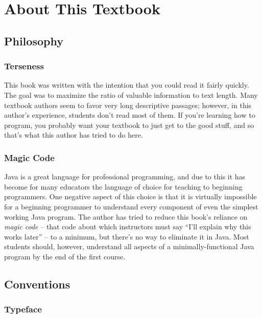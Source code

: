 
\chapter{About This Textbook}

\minitoc

\section{Philosophy}

\subsection{Terseness}
This book was written with the intention that you could read it fairly quickly.  The goal was to maximize the ratio of valuable information to text length.  Many textbook authors seem to favor very long descriptive passages; however, in this author's experience, students don't read most of them.  If you're learning how to program, you probably want your textbook to just get to the good stuff, and so that's what this author has tried to do here.

\subsection{Magic Code}\label{subsection:magiccode}
Java is a great language for professional programming, and due to this it has become for many educators the language of choice for teaching to beginning programmers.  One negative aspect of this choice is that it is virtually impossible for a beginning programmer to understand every component of even the simplest working Java program.  The author has tried to reduce this book's reliance on \textit{magic code} -- that code about which instructors must say ``I'll explain why this works later'' -- to a minimum, but there's no way to eliminate it in Java.  Most students should, however, understand all aspects of a minimally-functional Java program by the end of the first course.

\section{Conventions}

\subsection*{Typeface}

